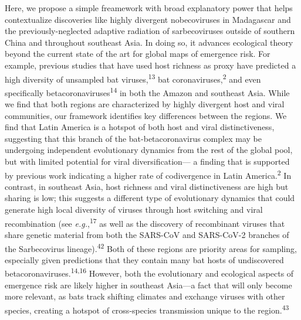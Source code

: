 \documentclass[11pt]{article}
\begin{document}
Here, we propose a simple freamework with broad explanatory power that
helps contextualize discoveries like highly divergent nobecoviruses in
Madagascar and the previously-neglected adaptive radiation of
sarbecoviruses outside of southern China and throughout southeast Asia.
In doing so, it advances ecological theory beyond the current state of
the art for global maps of emergence risk. For example, previous studies
that have used host richness as proxy have predicted a high diversity of
unsampled bat viruses,\textsuperscript{13} bat
coronaviruses,\textsuperscript{2} and even specifically
betacoronaviruses\textsuperscript{14} in both the Amazon and southeast
Asia. While we find that both regions are characterized by highly
divergent host and viral communities, our framework identifies key
differences between the regions. We find that Latin America is a hotspot
of both host and viral distinctiveness, suggesting that this branch of
the bat-betacoronavirus complex may be undergoing independent
evolutionary dynamics from the rest of the global pool, but with limited
potential for viral diversification--- a finding that is supported by
previous work indicating a higher rate of codivergence in Latin
America.\textsuperscript{2} In contrast, in southeast Asia, host
richness and viral distinctiveness are high but sharing is low; this
suggests a different type of evolutionary dynamics that could generate
high local diversity of viruses through host switching and viral
recombination (see \emph{e.g.},\textsuperscript{17} as well as the
discovery of recombinant viruses that share genetic material from both
the SARS-CoV and SARS-CoV-2 branches of the Sarbecovirus
lineage).\textsuperscript{42} Both of these regions are priority areas
for sampling, especially given predictions that they contain many bat
hosts of undiscovered betacoronaviruses.\textsuperscript{14,16} However,
both the evolutionary and ecological aspects of emergence risk are
likely higher in southeast Asia---a fact that will only become more
relevant, as bats track shifting climates and exchange viruses with
other species, creating a hotspot of cross-species transmission unique
to the region.\textsuperscript{43}
\end{document}

